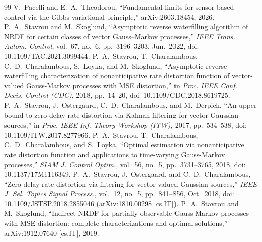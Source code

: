 \begin{thebibliography}{99}
V.~Pacelli and E.~A.~Theodorou, ``Fundamental limits for sensor-based control via
the Gibbs variational principle,'' arXiv:2603.18454, 2026.
P.~A.~Stavrou and M.~Skoglund, ``Asymptotic reverse waterfilling algorithm of NRDF
for certain classes of vector Gauss--Markov processes,'' \emph{IEEE Trans. Autom.
Control}, vol.~67, no.~6, pp.~3196--3203, Jun.~2022, doi: 10.1109/TAC.2021.3099444.
P.~A.~Stavrou, T.~Charalambous, C.~D.~Charalambous, S.~Loyka, and M.~Skoglund,
``Asymptotic reverse-waterfilling characterization of nonanticipative rate
distortion function of vector-valued Gauss-Markov processes with MSE
distortion,'' in \emph{Proc. IEEE Conf. Decis. Control (CDC)}, 2018, pp.~14--20,
doi: 10.1109/CDC.2018.8619725.
P.~A.~Stavrou, J.~Ostergaard, C.~D.~Charalambous, and M.~Derpich, ``An upper bound
to zero-delay rate distortion via Kalman filtering for vector Gaussian sources,''
in \emph{Proc. IEEE Inf. Theory Workshop (ITW)}, 2017, pp.~534--538,
doi: 10.1109/ITW.2017.8277966.
P.~A.~Stavrou, T.~Charalambous, C.~D.~Charalambous, and S.~Loyka, ``Optimal
estimation via nonanticipative rate distortion function and applications to
time-varying Gauss-Markov processes,'' \emph{SIAM J. Control Optim.}, vol.~56,
no.~5, pp.~3731--3765, 2018, doi: 10.1137/17M1116349.
P.~A.~Stavrou, J.~Ostergaard, and C.~D.~Charalambous, ``Zero-delay rate
distortion via filtering for vector-valued Gaussian sources,'' \emph{IEEE J.
Sel. Topics Signal Process.}, vol.~12, no.~5, pp.~841--856, Oct.~2018,
doi: 10.1109/JSTSP.2018.2855046 (arXiv:1810.00298 [cs.IT]).
P.~A.~Stavrou and M.~Skoglund, ``Indirect NRDF for partially observable
Gauss-Markov processes with MSE distortion: complete characterizations and
optimal solutions,'' arXiv:1912.07640 [cs.IT], 2019.
\end{thebibliography}
